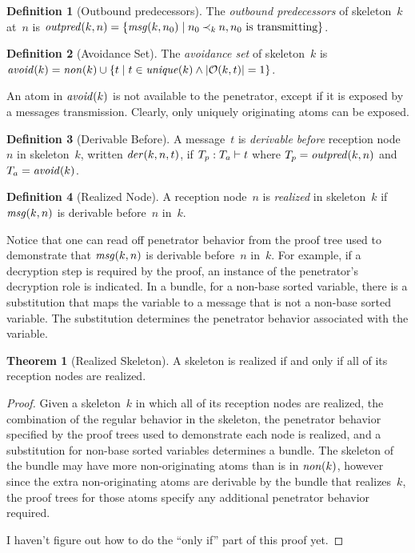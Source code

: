 \documentclass[12pt]{article}
\theoremstyle{definition}
\newtheorem{defn}{Definition}[section]
\newtheorem{thm}{Theorem}[section]
\newenvironment{note}{\itshape\par\noindent}{}
\begin{document}
\begin{defn}[Outbound predecessors]
The \emph{outbound predecessors} of skeleton~$k$ at~$n$ is
$\fn{outpred}(k,n)=\{\fn{msg}(k,n_0)\mid n_0 \kprec{k} n, n_0\mbox{~is
  transmitting}\}$.
\end{defn}

\begin{defn}[Avoidance Set]\label{def:avoid}
The \emph{avoidance set} of skeleton~$k$ is
$\fn{avoid}(k)=\fn{non}(k)\cup\{t\mid
t\in\fn{unique}(k)\land|\orig(k,t)|=1\}$.
\end{defn}

An atom in $\fn{avoid}(k)$ is not available to the penetrator, except
if it is exposed by a messages transmission.  Clearly, only uniquely
originating atoms can be exposed.

\begin{defn}[Derivable Before]\label{def:der}
A message~$t$ is \emph{derivable before} reception node~$n$ in
skeleton~$k$, written $\fn{der}(k,n,t)$, if $\der{t}{T_p}{T_a}$ where
$T_p=\fn{outpred}(k,n)$ and $T_a=\fn{avoid}(k)$.
\end{defn}

\begin{defn}[Realized Node]
A reception node~$n$ is \emph{realized} in skeleton~$k$ if
$\fn{msg}(k,n)$ is derivable before~$n$ in~$k$.
\end{defn}

Notice that one can read off penetrator behavior from the proof tree
used to demonstrate that $\fn{msg}(k,n)$ is derivable before~$n$
in~$k$.  For example, if a decryption step is required by the proof,
an instance of the penetrator's decryption role is indicated.  In a
bundle, for a non-base sorted variable, there is a substitution that
maps the variable to a message that is not a non-base sorted variable.
The substitution determines the penetrator behavior associated with
the variable.

\begin{thm}[Realized Skeleton]
A skeleton is realized if and only if all of its reception nodes are
realized.
\end{thm}

\begin{proof}
Given a skeleton~$k$ in which all of its reception nodes are realized,
the combination of the regular behavior in the skeleton, the
penetrator behavior specified by the proof trees used to demonstrate
each node is realized, and a substitution for non-base sorted
variables determines a bundle.  The skeleton of the bundle may have
more non-originating atoms than is in $\fn{non}(k)$, however since the
extra non-originating atoms are derivable by the bundle that
realizes~$k$, the proof trees for those atoms specify any additional
penetrator behavior required.

\begin{note}
I haven't figure out how to do the ``only if'' part of this proof yet.
\end{note}
\end{proof}
\end{document}
